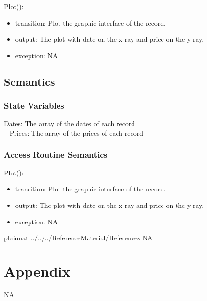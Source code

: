 \documentclass[12pt, titlepage]{article}
\begin{document}
\noindent Plot():
\begin{itemize}
\item transition: Plot the graphic interface of the record.
\item output: The plot with date on the x ray and price on the y ray.
\item exception: NA
\end{itemize}

\subsection{Semantics}
\subsubsection{State Variables}
Dates: The array of the dates of each record\\ 
~\newline
Prices: The array of the prices of each record\\ 
\subsubsection{Access Routine Semantics}

\noindent Plot():
\begin{itemize}
\item transition: Plot the graphic interface of the record.
\item output: The plot with date on the x ray and price on the y ray.
\item exception: NA
\end{itemize}

\newpage

 {plainnat}
 {../../../ReferenceMaterial/References}
NA
\newpage

\section{Appendix} \label{Appendix}

NA
\end{document}
